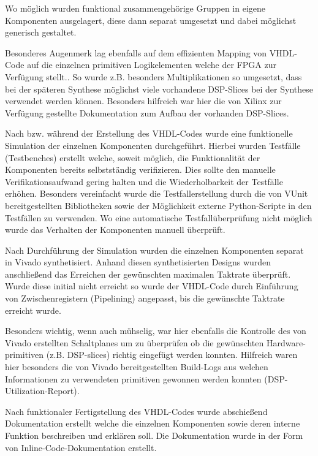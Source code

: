 Wo möglich wurden funktional zusammengehörige Gruppen in eigene Komponenten ausgelagert, diese dann separat umgesetzt und dabei möglichst generisch gestaltet.

Besonderes Augenmerk lag ebenfalls auf dem effizienten Mapping von \acs{VHDL}-Code auf die einzelnen primitiven Logikelementen welche der \acs{FPGA} zur Verfügung stellt.. 
So wurde z.B. besonders Multiplikationen so umgesetzt, dass bei der späteren Synthese möglichst viele vorhandene \acs{DSP}-Slices bei der Synthese verwendet werden können.
Besonders hilfreich war hier die von Xilinx zur Verfügung gestellte Dokumentation zum Aufbau der vorhanden DSP-Slices\cite{XLX_DSP}.

Nach bzw. während der Erstellung des \acs{VHDL}-Codes wurde eine funktionelle Simulation der einzelnen Komponenten durchgeführt.
Hierbei wurden Testfälle (Testbenches) erstellt welche, soweit möglich, die Funktionalität der Komponenten bereits selbstständig verifizieren.
Dies sollte den manuelle Verifikationsaufwand gering halten und die Wiederholbarkeit der Testfälle erhöhen.
Besonders vereinfacht wurde die Testfallerstellung durch die von VUnit bereitgestellten Bibliotheken sowie der Möglichkeit externe Python-Scripte in den Testfällen zu verwenden.
Wo eine automatische Testfallüberprüfung nicht möglich wurde das Verhalten der Komponenten manuell überprüft.

Nach Durchführung der Simulation wurden die einzelnen Komponenten separat in Vivado synthetisiert.
Anhand diesen synthetisierten Designs wurden anschließend das Erreichen der gewünschten maximalen Taktrate überprüft.
Wurde diese initial nicht erreicht so wurde der \acs{VHDL}-Code durch Einführung von Zwischenregistern (Pipelining) angepasst, bis die gewünschte Taktrate erreicht wurde.

Besonders wichtig, wenn auch mühselig, war hier ebenfalls die Kontrolle des von Vivado erstellten Schaltplanes um zu überprüfen ob die gewünschten Hardware-primitiven (z.B. \acs{DSP}-slices)
richtig eingefügt werden konnten. 
Hilfreich waren hier besonders die von Vivado bereitgestellten Build-Logs aus welchen Informationen zu verwendeten primitiven gewonnen werden konnten (DSP-Utilization-Report).

Nach funktionaler Fertigstellung des \acs{VHDL}-Codes wurde abschießend Dokumentation erstellt welche die einzelnen Komponenten sowie deren interne Funktion beschreiben und erklären soll.
Die Dokumentation wurde in der Form von Inline-Code-Dokumentation erstellt.

